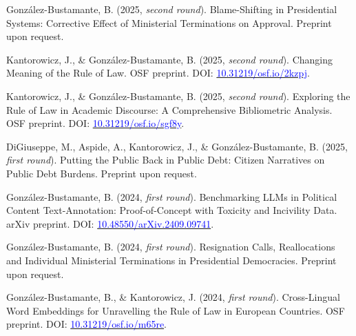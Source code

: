 \begin{publications}

\begin{benumerate}{8}

\item{González-Bustamante, B. (2025, {\itshape second round}). Blame-Shifting in Presidential Systems: Corrective Effect of Ministerial Terminations on Approval. Preprint upon request.}\vspace{1mm}

\item{Kantorowicz, J., \& González-Bustamante, B. (2025, {\itshape second round}). Changing Meaning of the Rule of Law. OSF preprint. DOI: \href{https://doi.org/10.31219/osf.io/2kzpj}{\textcolor{blue}{10.31219/osf.io/2kzpj}}.}\vspace{1mm}

\item{Kantorowicz, J., \& González-Bustamante, B. (2025, {\itshape second round}). Exploring the Rule of Law in Academic Discourse: A Comprehensive Bibliometric Analysis. OSF preprint. DOI: \href{https://doi.org/10.31219/osf.io/sgf8y}{\textcolor{blue}{10.31219/osf.io/sgf8y}}.}\vspace{1mm}

\item{DiGiuseppe, M., Aspide, A., Kantorowicz, J., \& González-Bustamante, B. (2025, {\itshape first round}). Putting the Public Back in Public Debt: Citizen Narratives on Public Debt Burdens. Preprint upon request.}\vspace{1mm}

\item{González-Bustamante, B. (2024, {\itshape first round}). Benchmarking LLMs in Political Content Text-Annotation: Proof-of-Concept with Toxicity and Incivility Data. arXiv preprint. DOI: \href{https://doi.org/10.48550/arXiv.2409.09741}{\textcolor{blue}{10.48550/arXiv.2409.09741}}.}\vspace{1mm}

\item{González-Bustamante, B. (2024, {\itshape first round}). Resignation Calls, Reallocations and Individual Ministerial Terminations in Presidential Democracies. Preprint upon request.}\vspace{1mm} %

\item{González-Bustamante, B., \& Kantorowicz, J. (2024, {\itshape first round}). Cross-Lingual Word Embeddings for Unravelling the Rule of Law in European Countries. OSF preprint. DOI: \href{https://doi.org/10.31219/osf.io/m65re}{\textcolor{blue}{10.31219/osf.io/m65re}}.}\vspace{1mm}


\end{benumerate}
\end{publications}
